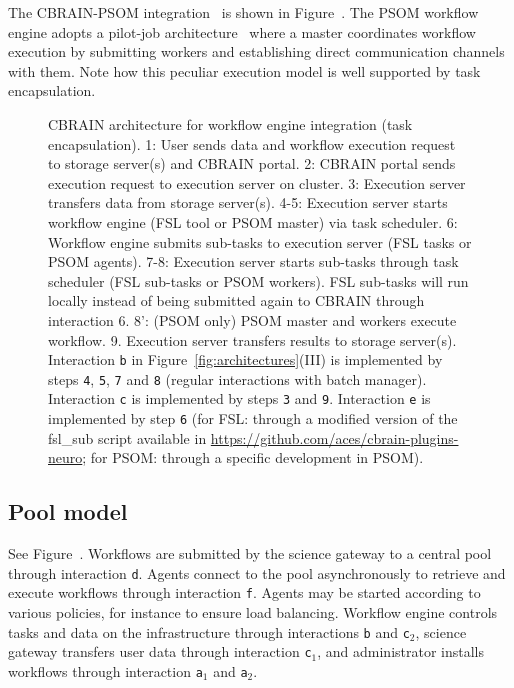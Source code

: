 \documentclass[preprint,3p,twocolumn]{elsarticle}
\begin{document}
The CBRAIN-PSOM integration~\cite{GLAT-16} is shown in
Figure~. The PSOM workflow engine
adopts a pilot-job architecture~\cite{turilli2015comprehensive} where
a master coordinates workflow execution by submitting workers and
establishing direct communication channels with them. Note how this
peculiar execution model is well supported by task encapsulation.

\begin{figure}
\centering
{} \hfill {}
\caption{CBRAIN architecture for workflow engine integration
  (task encapsulation).  1: User sends data and workflow execution request to
  storage server(s) and CBRAIN portal. 2: CBRAIN portal sends
  execution request to execution server on cluster. 3: Execution
  server transfers data from storage server(s). 4-5: Execution server
  starts workflow engine (FSL tool or PSOM master) via task
  scheduler. 6: Workflow engine submits sub-tasks to execution server
  (FSL tasks or PSOM agents). 7-8: Execution server starts sub-tasks
  through task scheduler (FSL sub-tasks or PSOM workers). FSL sub-tasks will run locally
  instead of being submitted again to CBRAIN through interaction 6. 8':
  (PSOM only) PSOM master and workers execute workflow. 9. Execution
  server transfers results to storage server(s). Interaction
  \texttt{b} in Figure~\ref{fig:architectures}(III) is implemented by steps
  \texttt{4}, \texttt{5}, \texttt{7} and \texttt{8} (regular
  interactions with batch manager). Interaction \texttt{c} is
  implemented by steps \texttt{3} and \texttt{9}. Interaction
  \texttt{e} is implemented by step \texttt{6} (for FSL: through a
  modified version of the fsl\_sub script available in
  \url{https://github.com/aces/cbrain-plugins-neuro}; for PSOM:
  through a specific development in PSOM).}
\label{fig:cbrain-sub-tasking}
\end{figure}

\subsection{Pool model}
\label{sec:pool}
See Figure~. Workflows are submitted by the
science gateway to a central pool through interaction
\texttt{d}. Agents connect to the pool asynchronously to retrieve and
execute workflows through interaction \texttt{f}. Agents may be
started according to various policies, for instance to ensure load
balancing. Workflow engine controls tasks and data on the
infrastructure through interactions \texttt{b} and \texttt{c$_2$},
science gateway transfers user data through interaction
\texttt{c$_1$}, and administrator installs workflows through
interaction \texttt{a$_1$} and \texttt{a$_2$}.
\end{document}
